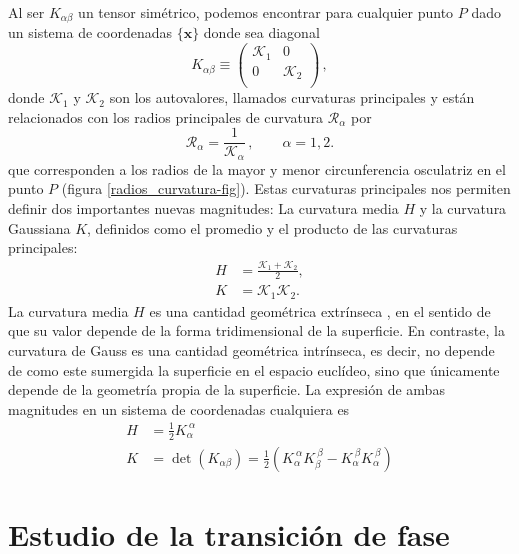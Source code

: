 Al ser $K_{\alpha\beta}$ un tensor simétrico, podemos encontrar para cualquier
punto $P$ dado un sistema de coordenadas $\{\mathbf{x}\}$ donde sea diagonal
\begin{equation*}
K_{\alpha\beta}\equiv\left(\begin{array}{cc}
\mathcal{K}_1 & 0\\
0 & \mathcal{K}_2\\
\end{array}\right)\, ,
\end{equation*} 
donde $\mathcal{K}_1$ y $\mathcal{K}_2$ son los autovalores, llamados
curvaturas principales y están relacionados con los radios principales
de curvatura $\mathcal{R}_{\alpha}$ por
\begin{equation*}
\mathcal{R}_{\alpha}=\frac{1}{\mathcal{K}_{\alpha}} \, , \qquad \alpha=1,2.
\end{equation*}
que corresponden a los radios de la mayor y menor circunferencia osculatriz en
el punto $P$ (figura \ref{radios_curvatura-fig}).
Estas curvaturas principales nos permiten definir dos importantes nuevas magnitudes:
La curvatura media $H$ y la curvatura Gaussiana $K$, definidos como el
promedio y el producto de las curvaturas principales:
\begin{align*}
H&=\frac{\mathcal{K}_1+\mathcal{K}_2}{2},\\
K&=\mathcal{K}_1\mathcal{K}_2.
\end{align*}
La curvatura media $H$ es una cantidad geométrica extrínseca \cite{LuisLinares}, en el sentido de
que su valor depende de la forma tridimensional de la superficie. En
contraste, la curvatura de Gauss es una cantidad geométrica intrínseca, es
decir, no depende de como este sumergida la superficie en el espacio euclídeo,
sino que únicamente depende de la geometría propia de la superficie. La
expresión de ambas magnitudes en un sistema de coordenadas cualquiera es
\begin{align}
H&= \frac{1}{2}K_{\alpha}^{\ \alpha}\label{curvatura_media}\\
K&= \det(K_{\alpha\beta})=\frac{1}{2}(K_{\alpha}^{\ \alpha}K_{\beta}^{\ \beta}-K_{\alpha}^{\ \beta}K_{\alpha}^{\ \beta})\label{curvatura_gaussiana}
\end{align}

\section{Estudio de la transición de fase}

